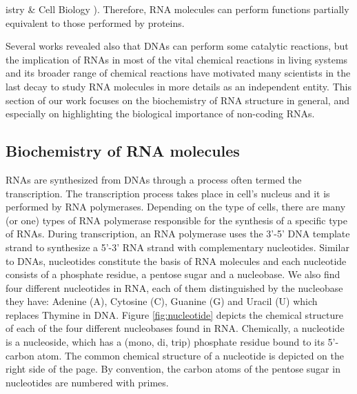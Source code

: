 istry \& Cell Biology ). Therefore, RNA molecules can perform functions partially equivalent to those performed by proteins. 

Several works revealed also that DNAs can perform some catalytic reactions, but the implication of RNAs in most of the vital chemical reactions in living systems and its broader range of chemical reactions have motivated many scientists in the last decay to study RNA molecules in more details as an independent entity.  This section of our work focuses on the biochemistry of RNA structure in general, and especially on highlighting the biological importance of non-coding RNAs. 
\subsection{Biochemistry of RNA molecules}\label{sec:rna_biochemical}

RNAs are synthesized from DNAs through a process often termed the transcription. The transcription process takes place in cell's nucleus and it is performed by RNA polymerases. Depending on the type of cells, there are many (or one) types of RNA polymerase responsible for the synthesis of a specific type of RNAs. During transcription, an RNA polymerase uses the 3’-5’ DNA template strand to synthesize a 5’-3’ RNA strand with complementary nucleotides. Similar to DNAs, nucleotides constitute the basis of  RNA molecules and each nucleotide consists of a phosphate residue, a pentose sugar and a nucleobase. We also find four different nucleotides in RNA, each of them distinguished by the nucleobase they have: Adenine (A), Cytosine (C), Guanine (G) and Uracil (U) which replaces Thymine in DNA. Figure \ref{fig:nucleotide} depicts the chemical structure of each of the four different nucleobases found in RNA. Chemically, a nucleotide is a nucleoside, which has a (mono, di, trip) phosphate residue bound to its 5'-carbon atom. The common chemical structure of a nucleotide is depicted on the right side of the page. By convention, the carbon atoms of the pentose sugar in nucleotides are numbered with primes.

